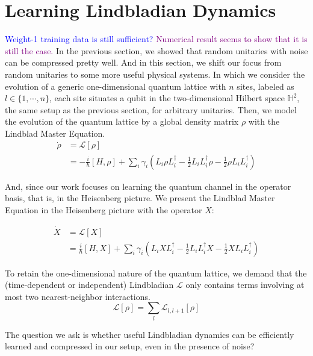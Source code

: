 \documentclass[%
 reprint,
superscriptaddress,
 amsmath,amssymb,
 aps,
]{revtex4-2}
\newcommand{\yijian}[1]{\textcolor{blue}{#1}}
\newcommand{\simba}[1]{\textcolor{purple}{#1}}
\begin{document}
\section{Learning Lindbladian Dynamics}
\yijian{Weight-1 training data is still sufficient?}
\simba{Numerical result seems to show that it is still the case.}
In the previous section, we showed that random unitaries with noise can be compressed pretty well. And in this section, we shift our focus from random unitaries to some more useful physical systems. In which we consider the evolution of a generic one-dimensional quantum lattice with $n$ sites, labeled as $l\in\{1, \cdots, n\}$, each site situates a qubit in the two-dimensional Hilbert space $\mathbb{H}^2$, the same setup as the previous section, for arbitrary unitaries. Then, we model the evolution of the quantum lattice by a global density matrix $\rho$ with the Lindblad Master Equation.
\begin{equation}
\begin{split}
    \dot{\rho} &= \mathcal{L}[\rho]\\
    &=-\frac{i}{\hbar}[H, \rho]+\sum_{i}\gamma_i\left(L_i\rho L_i^\dagger - \frac{1}{2}L_iL_i^\dagger\rho- \frac{1}{2}\rho L_iL_i^\dagger\right)
\end{split}
\end{equation}

And, since our work focuses on learning the quantum channel in the operator basis, that is, in the Heisenberg picture. We present the Lindblad Master Equation in the Heisenberg picture with the operator $X$:

\begin{equation}
\begin{split}
    \dot{X} &= \mathcal{L}[X]\\
    &=\frac{i}{\hbar}[H, X]+\sum_{i}\gamma_i\left(L_iX L_i^\dagger - \frac{1}{2}L_iL_i^\dagger X- \frac{1}{2}X L_iL_i^\dagger\right)
\end{split}
\end{equation}

To retain the one-dimensional nature of the quantum lattice, we demand that the (time-dependent or independent) Lindbladian $\mathcal{L}$ only contains terms involving at most two nearest-neighbor interactions.
\begin{equation}
    \mathcal{L}[\rho]=\sum_l\mathcal{L}_{l, l+1}[\rho]
\end{equation}

The question we ask is whether useful Lindbladian dynamics can be efficiently learned and compressed in our setup, even in the presence of noise?
\end{document}
